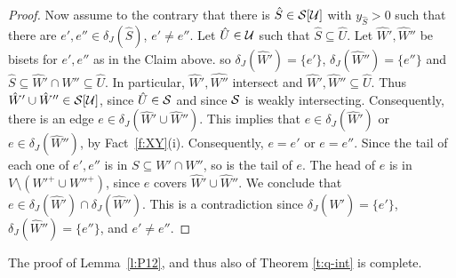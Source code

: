 \begin{proof}
Now assume to the contrary that there is $\hat{S} \in {\cal S}[{\cal U}]$ with $y_{\hat{S}}>0$ 
such that there are $e',e'' \in \delta_J(\hat{S})$, $e' \neq e''$.
Let $\hat{U} \in {\cal U}$ such that $\hat{S} \subseteq \hat{U}$.
Let $\hat{W}',\hat{W}''$ be bisets for $e',e''$ as in the Claim above. 
so $\delta_J(\hat{W}')=\{e'\}$, $\delta_J(\hat{W}'')=\{e''\}$ and 
$\hat{S} \subseteq \hat{W}' \cap \hat{W}'' \subseteq \hat{U}$.
In particular, $\hat{W}',\hat{W''}$ intersect and $\hat{W}',\hat{W}'' \subseteq \hat{U}$.
Thus $\hat{W}' \cup \hat{W}'' \in {\cal S}[{\cal U}]$, since $\hat{U} \in {\cal S}$ 
and since ${\cal S}$ is weakly intersecting.
Consequently, there is an edge $e \in \delta_J(\hat{W}' \cup \hat{W}'')$. 
This implies that $e \in \delta_J(\hat{W}')$ or $e \in \delta_J(\hat{W}'')$, by Fact~\ref{f:XY}(i).
Consequently, $e=e'$ or $e=e''$.
Since the tail of each one of $e',e''$ is in $S \subseteq W' \cap W''$, so is the tail of $e$.
The head of $e$ is in $V \setminus (W'^+ \cup W''^+)$, since $e$ covers $\hat{W}' \cup \hat{W}''$.
We conclude that $e \in \delta_J(\hat{W}') \cap \delta_J(\hat{W}'')$. This is a contradiction since 
$\delta_J(\hat{W}') = \{e'\}$, $\delta_J(\hat{W}'') = \{e''\}$, and $e' \neq e''$. 
\end{proof}

The proof of Lemma~\ref{l:P12}, and thus also of Theorem \ref{t:q-int} is complete.

